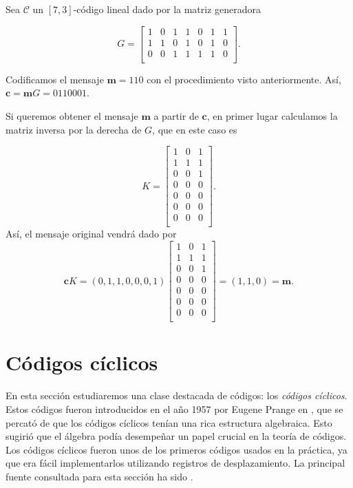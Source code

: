 \begin{ejemplo}

  Sea $\mathcal{C}$ un $[7,3]$-código lineal dado por la matriz generadora

  $$ G = \left[\begin{array}{ccccccc}
    1&0&1&1&0&1&1\\
    1&1&0&1&0&1&0\\
    0&0&1&1&1&1&0\\
    \end{array}\right].
    $$
  
 Codificamos el mensaje $\mathbf{m} = 110$ con el procedimiento visto anteriormente. Así, $\mathbf{c} = \mathbf{m}G = 0110001$.

  Si queremos obtener el mensaje $\mathbf{m}$ a partir de $\mathbf{c}$, en primer lugar calculamos la matriz inversa por la derecha de $G$, que en este caso es

  $$ K = \left[\begin{array}{ccc}
    1&0&1\\
    1&1&1\\
    0&0&1\\
    0&0&0\\
    0&0&0\\
    0&0&0\\
    0&0&0\\
    \end{array}\right].
    $$
  Así, el mensaje original vendrá dado por $$\mathbf{c}K = (0,1,1,0,0,0,1)\left[\begin{array}{ccc}
    1&0&1\\
    1&1&1\\
    0&0&1\\
    0&0&0\\
    0&0&0\\
    0&0&0\\
    0&0&0\\
    \end{array}\right] = (1,1,0) = \mathbf{m}.$$
\end{ejemplo}

\section{Códigos cíclicos}

En esta sección estudiaremos una clase destacada de códigos: los \emph{códigos cíclicos}. Estos códigos fueron introducidos en el año 1957 por Eugene Prange en \cite{prange1957cyclic}, que se percató de que los códigos cíclicos tenían una rica estructura algebraica. Esto sugirió que el álgebra podía desempeñar un papel crucial en la teoría de códigos. Los códigos cíclicos fueron unos de los primeros códigos usados en la práctica, ya que era fácil implementarlos utilizando registros de desplazamiento.
La principal fuente consultada para esta sección ha sido \cite{Huffman_Pless_2010}.

